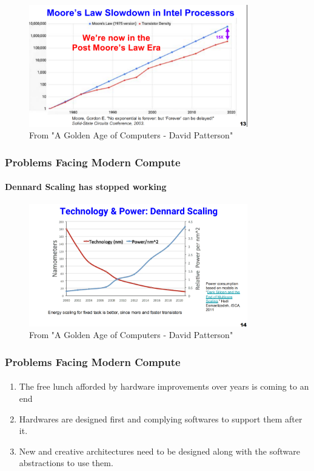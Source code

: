 \documentclass{beamer}
\begin{document}
{\begin{frame}[fragile]
  \begin{figure}
    \centering
    \includegraphics[width=0.85\textwidth]{mooreslaw.png}
    \caption{From "A Golden Age of Computers - David Patterson"
    \cite{patterson19}}
  \end{figure}

\end{frame}

\begin{frame}[fragile]
\frametitle{Problems Facing Modern Compute}
  \framesubtitle{Dennard Scaling has stopped working}

  \begin{figure}
    \centering
    \includegraphics[width=0.85\textwidth]{dennardscaling.png}
    \caption{From "A Golden Age of Computers - David Patterson"}
  \end{figure}
\end{frame}

\begin{frame}[fragile]
\frametitle{Problems Facing Modern Compute}
  \framesubtitle{}
  \begin{enumerate}
    \item The free lunch afforded by hardware improvements over years
      is coming to an end
    \item Hardwares are designed first and complying softwares to support
      them after it.
    \item New and creative architectures need to be designed along with the
      software abstractions to use them. 
  \end{enumerate}
\end{frame}


}
\end{document}
